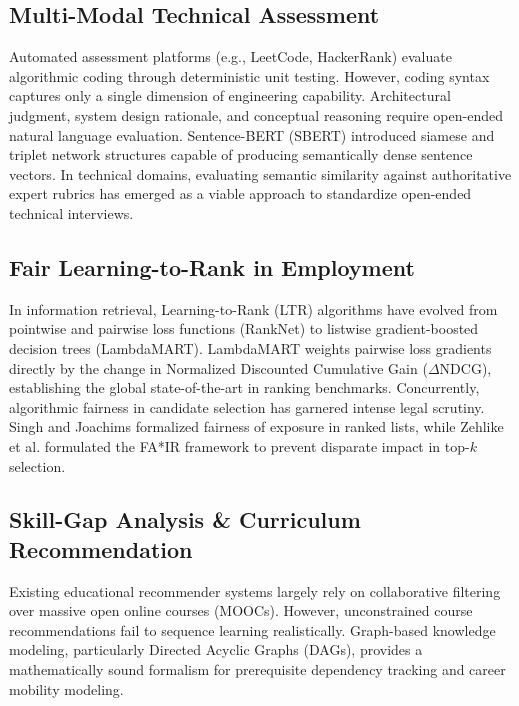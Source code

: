 \documentclass[conference]{IEEEtran}
\begin{document}
\subsection{Multi-Modal Technical Assessment}
Automated assessment platforms (e.g., LeetCode, HackerRank) evaluate algorithmic coding through deterministic unit testing. However, coding syntax captures only a single dimension of engineering capability. Architectural judgment, system design rationale, and conceptual reasoning require open-ended natural language evaluation. Sentence-BERT (SBERT) introduced siamese and triplet network structures capable of producing semantically dense sentence vectors. In technical domains, evaluating semantic similarity against authoritative expert rubrics has emerged as a viable approach to standardize open-ended technical interviews.

\subsection{Fair Learning-to-Rank in Employment}
In information retrieval, Learning-to-Rank (LTR) algorithms have evolved from pointwise and pairwise loss functions (RankNet) to listwise gradient-boosted decision trees (LambdaMART). LambdaMART weights pairwise loss gradients directly by the change in Normalized Discounted Cumulative Gain ($\Delta\text{NDCG}$), establishing the global state-of-the-art in ranking benchmarks. Concurrently, algorithmic fairness in candidate selection has garnered intense legal scrutiny. Singh and Joachims formalized fairness of exposure in ranked lists, while Zehlike et al. formulated the FA*IR framework to prevent disparate impact in top-$k$ selection.

\subsection{Skill-Gap Analysis \& Curriculum Recommendation}
Existing educational recommender systems largely rely on collaborative filtering over massive open online courses (MOOCs). However, unconstrained course recommendations fail to sequence learning realistically. Graph-based knowledge modeling, particularly Directed Acyclic Graphs (DAGs), provides a mathematically sound formalism for prerequisite dependency tracking and career mobility modeling.
\end{document}
